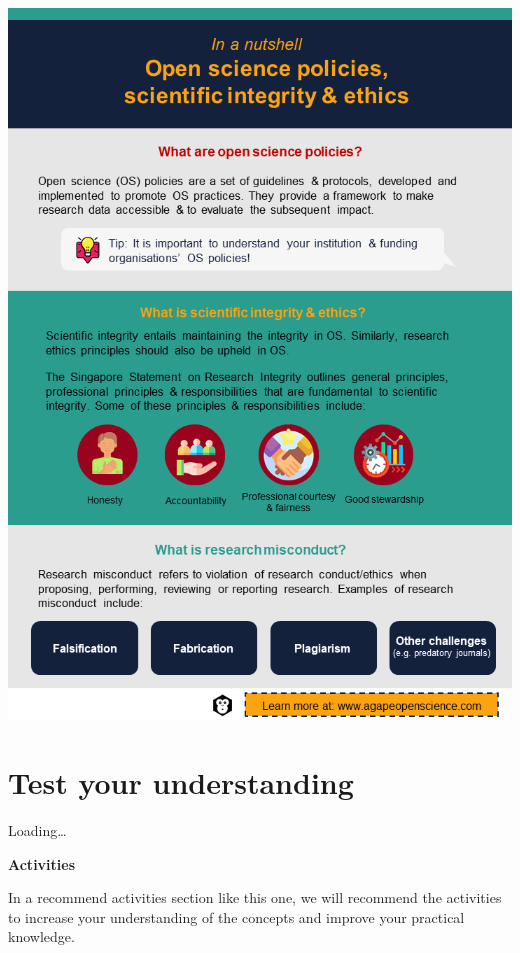 \documentclass[
]{book}
\begin{document}
\begin{center}\includegraphics[width=0.7\linewidth]{images/slide8} \end{center}

\hypertarget{test-your-understanding-6}{%
\section{Test your understanding}\label{test-your-understanding-6}}

Loading\ldots{}

\textbf{Activities}

In a recommend activities section like this one, we will recommend the activities to increase your understanding of the concepts and improve your practical knowledge.
\end{document}
